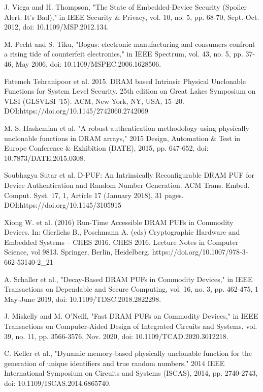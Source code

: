 \documentclass[journal, a4paper]{IEEEtran}
\begin{document}
\begin{thebibliography}{1}

    J. Viega and H. Thompson, "The State of Embedded-Device Security (Spoiler Alert: It's Bad)," in IEEE Security \& Privacy, vol. 10, no. 5, pp. 68-70, Sept.-Oct. 2012, doi: 10.1109/MSP.2012.134.

    M. Pecht and S. Tiku, "Bogus: electronic manufacturing and consumers confront a rising tide of counterfeit electronics," in IEEE Spectrum, vol. 43, no. 5, pp. 37-46, May 2006, doi: 10.1109/MSPEC.2006.1628506.

    Fatemeh Tehranipoor et al. 2015. DRAM based Intrinsic Physical Unclonable Functions for System Level Security. 25th edition on Great Lakes Symposium on VLSI (GLSVLSI '15). ACM, New York, NY, USA, 15–20. DOI:https://doi.org/10.1145/2742060.2742069

    M. S. Hashemian et al. "A robust authentication methodology using physically unclonable functions in DRAM arrays," 2015 Design, Automation \& Test in Europe Conference \& Exhibition (DATE), 2015, pp. 647-652, doi: 10.7873/DATE.2015.0308.

    Soubhagya Sutar et al. D-PUF: An Intrinsically Reconfigurable DRAM PUF for Device Authentication and Random Number Generation. ACM Trans. Embed. Comput. Syst. 17, 1, Article 17 (January 2018), 31 pages. DOI:https://doi.org/10.1145/3105915

    Xiong W. et al. (2016) Run-Time Accessible DRAM PUFs in Commodity Devices. In: Gierlichs B., Poschmann A. (eds) Cryptographic Hardware and Embedded Systems – CHES 2016. CHES 2016. Lecture Notes in Computer Science, vol 9813. Springer, Berlin, Heidelberg. https://doi.org/10.1007/978-3-662-53140-2\_21

    A. Schaller et al., "Decay-Based DRAM PUFs in Commodity Devices," in IEEE Transactions on Dependable and Secure Computing, vol. 16, no. 3, pp. 462-475, 1 May-June 2019, doi: 10.1109/TDSC.2018.2822298.

    J. Miskelly and M. O’Neill, "Fast DRAM PUFs on Commodity Devices," in IEEE Transactions on Computer-Aided Design of Integrated Circuits and Systems, vol. 39, no. 11, pp. 3566-3576, Nov. 2020, doi: 10.1109/TCAD.2020.3012218.

    C. Keller et al., "Dynamic memory-based physically unclonable function for the generation of unique identifiers and true random numbers," 2014 IEEE International Symposium on Circuits and Systems (ISCAS), 2014, pp. 2740-2743, doi: 10.1109/ISCAS.2014.6865740.


\end{thebibliography}
\end{document}
